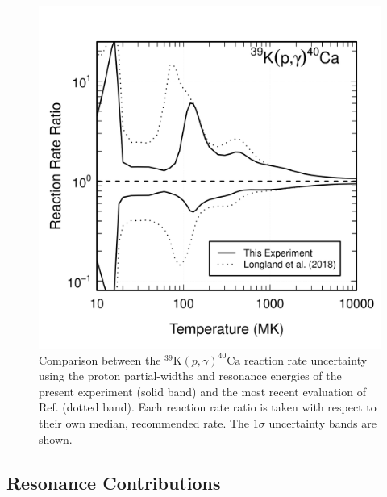 \begin{figure}[t]
\includegraphics[width=6.5in]{Chapter-6/figs/uncCompare.png} %
\caption{\label{fig:uncCompare}Comparison between the $^{39}\mathrm{K}(p, \gamma)^{40}\mathrm{Ca}$ reaction rate uncertainty using the proton partial-widths and resonance energies of the present experiment (solid band) and the most recent evaluation of Ref. \cite{Longland2018} (dotted band). Each reaction rate ratio is taken with respect to their own median, recommended rate. The $1\sigma$ uncertainty bands are shown.}
\end{figure}

\subsection{Resonance Contributions} \label{subsec:resonance_contributions}

